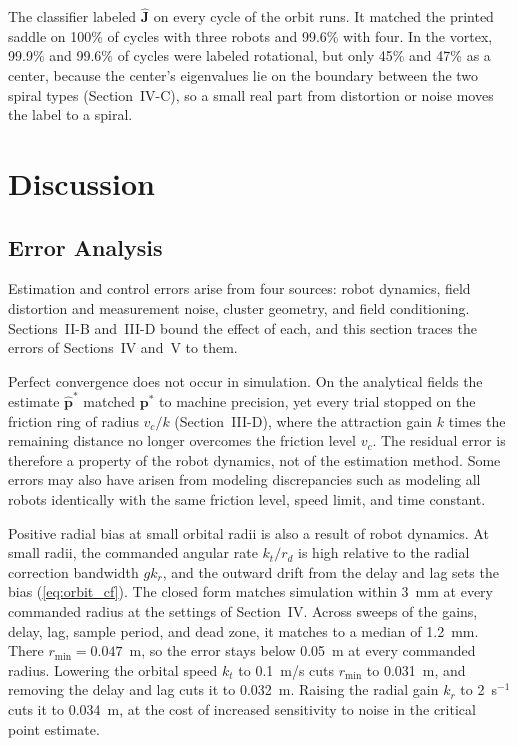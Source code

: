 \documentclass[lettersize,journal]{IEEEtran}
\newcommand{\rev}[1]{#1}
\begin{document}
The classifier labeled $\hat{\mathbf{J}}$ on every cycle of the orbit runs. It matched the printed saddle on \rev{100}\% of cycles with three robots and \rev{99.6}\% with four. In the vortex, \rev{99.9}\% and \rev{99.6}\% of cycles were labeled rotational, but only \rev{45}\% and \rev{47}\% as a center, because the center's eigenvalues lie on the boundary between the two spiral types (Section~IV-C), so a small real part from distortion or noise moves the label to a spiral.




\section{Discussion}

\subsection{Error Analysis}

Estimation and control errors arise from four sources: robot dynamics, field distortion and measurement noise, cluster geometry, and field conditioning. Sections~II-B and~III-D bound the effect of each, and this section traces the errors of Sections~IV and~V to them.

Perfect convergence does not occur in simulation. On the analytical fields the estimate $\hat{\mathbf{p}}^*$ matched $\mathbf{p}^*$ to machine precision, yet every trial stopped on the friction ring of radius $v_c/k$ (Section~III-D), where the attraction gain $k$ times the remaining distance no longer overcomes the friction level $v_c$. The residual error is therefore a property of the robot dynamics, not of the estimation method. Some errors may also have arisen from modeling discrepancies such as modeling all robots identically with the same friction level, speed limit, and time constant.

Positive radial bias at small orbital radii is also a result of robot dynamics. At small radii, the commanded angular rate $k_t / r_d$ is high relative to the radial correction bandwidth $gk_r$, and the outward drift from the delay and lag sets the bias (\ref{eq:orbit_cf}). The closed form matches simulation within \rev{3}~mm at every commanded radius at the settings of Section~IV. Across sweeps of the gains, delay, lag, sample period, and dead zone, it matches to a median of \rev{1.2}~mm. There $r_{\min} = \rev{0.047}$~m, so the error stays below 0.05~m at every commanded radius. Lowering the orbital speed $k_t$ to 0.1~m/s cuts $r_{\min}$ to \rev{0.031}~m, and removing the delay and lag cuts it to \rev{0.032}~m. Raising the radial gain $k_r$ to 2~s$^{-1}$ cuts it to \rev{0.034}~m, at the cost of increased sensitivity to noise in the critical point estimate.
\end{document}
